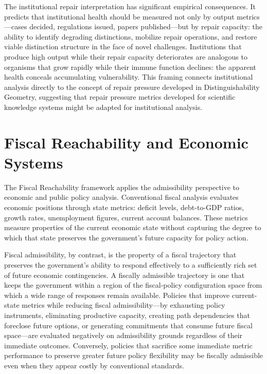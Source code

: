 \documentclass[11pt, oneside]{book}
\theoremstyle{definition}
\theoremstyle{remark}
\begin{document}
The institutional repair interpretation has significant empirical consequences. It predicts that institutional health should be measured not only by output metrics—cases decided, regulations issued, papers published—but by repair capacity: the ability to identify degrading distinctions, mobilize repair operations, and restore viable distinction structure in the face of novel challenges. Institutions that produce high output while their repair capacity deteriorates are analogous to organisms that grow rapidly while their immune function declines: the apparent health conceals accumulating vulnerability. This framing connects institutional analysis directly to the concept of repair pressure developed in Distinguishability Geometry, suggesting that repair pressure metrics developed for scientific knowledge systems might be adapted for institutional analysis.

\section{Fiscal Reachability and Economic Systems}

The Fiscal Reachability framework applies the admissibility perspective to economic and public policy analysis. Conventional fiscal analysis evaluates economic positions through state metrics: deficit levels, debt-to-GDP ratios, growth rates, unemployment figures, current account balances. These metrics measure properties of the current economic state without capturing the degree to which that state preserves the government's future capacity for policy action.

Fiscal admissibility, by contrast, is the property of a fiscal trajectory that preserves the government's ability to respond effectively to a sufficiently rich set of future economic contingencies. A fiscally admissible trajectory is one that keeps the government within a region of the fiscal-policy configuration space from which a wide range of responses remain available. Policies that improve current-state metrics while reducing fiscal admissibility—by exhausting policy instruments, eliminating productive capacity, creating path dependencies that foreclose future options, or generating commitments that consume future fiscal space—are evaluated negatively on admissibility grounds regardless of their immediate outcomes. Conversely, policies that sacrifice some immediate metric performance to preserve greater future policy flexibility may be fiscally admissible even when they appear costly by conventional standards.
\end{document}
